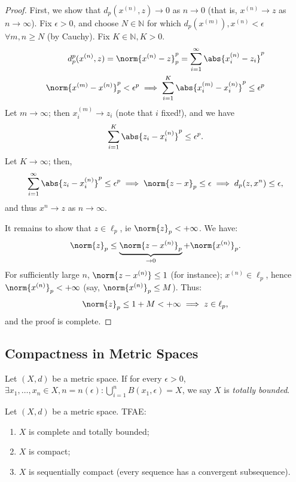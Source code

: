 \begin{proof}
    First, we show that $d_p(x^{(n)}, z) \to 0$ as $n \to 0$ (that is, $x^{(n)} \to z$ as $n \to \infty$). Fix $\epsilon >0$, and choose $N \in \mathbb{N}$ for which $d_p(x^{(m)}), x^{(n)} < \epsilon$ $\forall m, n \geq N$ (by Cauchy). Fix $K \in \mathbb{N}, K > 0$.
    \begin{align*}
        d_p^p(x^{(n)}, z) = \norm{x^{(n)} - z}_p^p = \sum_{i=1}^\infty \abs{x_i^{(n)} - z_i}^{p}\\
        \norm{x^{(m)} - x^{(n)}}_p^p < \epsilon^p \implies \sum_{i=1}^K\abs{x_i^{(m)} - x_i^{(n)}}^p \leq \epsilon^p
    \end{align*}
    Let $m \to \infty$; then $x_i^{(m)} \to z_i$ (note that $i$ fixed!), and we have \begin{align*}
        \sum_{i=1}^K\abs{z_i - x_i^{(n)}}^p \leq \epsilon^p.
    \end{align*}
    Let $K \to \infty$; then, 
    \begin{align*}
        \sum_{i=1}^\infty \abs{z_i - x_i^{(n)}}^p \leq \epsilon^p\implies \norm{z - x}_p \leq \epsilon\implies d_p(z, x^{n}) \leq \epsilon,
    \end{align*}
    and thus $x^{n} \to z$ as $n \to \infty$. 

    It remains to show that $z \in \ell_p$, ie $\norm{z}_p < + \infty$. We have:
    \begin{align*}
        \norm{z}_p \leq \underbrace{\norm{z - x^{(n)}}_p}_{\to 0} + \norm{x^{(n)}}_p.
    \end{align*}
    For sufficiently large $n$, $\norm{z - x^{(n)}} \leq 1$ (for instance); $x^{(n)} \in \ell_p$, hence $\norm{x^{(n)}}_p < + \infty$ (say, $\norm{x^{(n)}}_p \leq M$). Thus:\begin{align*}
        \norm{z}_p \leq 1 + M < + \infty \implies z \in \ell_p,
    \end{align*}
    and the proof is complete.
\end{proof}

\subsection{Compactness in Metric Spaces}
\begin{definition}
    Let $(X,d)$ be a metric space. If for every $\epsilon > 0$, $\exists x_1, \dots, x_n \in X, n = n(\epsilon) : \bigcup_{i=1}^n B(x_1, \epsilon) = X$, we say $X$ is \emph{totally bounded}.
\end{definition}
\begin{theorem}
Let $(X,d)$ be a metric space. TFAE:
\begin{enumerate}
    \item $X$ is complete and totally bounded;
    \item $X$ is compact;
    \item $X$ is sequentially compact (every sequence has a convergent subsequence).
\end{enumerate}
\end{theorem}